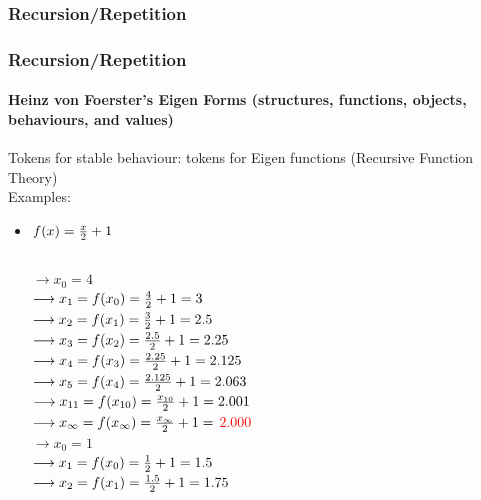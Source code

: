 \documentclass[
	11pt,
	aspectratio=169,
]{beamer}
\begin{document}
            \subsubsection{Recursion/Repetition}
                \begin{frame}
                    \frametitle{Recursion/Repetition}
                    \framesubtitle{Heinz von Foerster's Eigen Forms (structures, functions, objects, behaviours, and values)}
                    Tokens for stable behaviour: tokens for Eigen functions (Recursive Function Theory)\\
                    Examples:
                    \begin{itemize}
                        \item<1-> $f(x)= {{x}\over{2}} +1$\\
                            \fontsize{8}{9.2}\selectfont
                            \begin{columns}
                                    $\longrightarrow x_0=4$\\
                                    $\longrightarrow x_1=f(x_0) = {{4}\over{2}} + 1 = 3$ \\
                                    $\longrightarrow x_2=f(x_1) = {{3}\over{2}} + 1 = 2.5$ \\
                                    $\longrightarrow x_3=f(x_2) = {{2.5}\over{2}} + 1 = 2.25$\\
                                    $\longrightarrow x_4=f(x_3) = {{2.25}\over{2}} + 1 = 2.125$\\
                                    $\longrightarrow x_5=f(x_4) = {{2.125}\over{2}} + 1 = 2.063$\\
                                    $\longrightarrow x_{11}=f(x_{10}) = {{x_{10}}\over{2}} + 1 = 2.001$\\
                                    $\longrightarrow x_\infty=f(x_\infty) = {{x_\infty}\over{2}} + 1 =$ \textcolor{red}{$2.000$}\\
                                    $\longrightarrow x_0=1$\\
                                    $\longrightarrow x_1=f(x_0) = {{1}\over{2}} + 1 = 1.5$ \\
                                    $\longrightarrow x_2=f(x_1) = {{1.5}\over{2}} + 1 = 1.75$ \\

\end{columns}
\end{itemize}
\end{frame}
\end{document}
